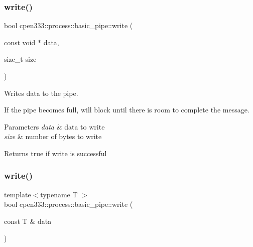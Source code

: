 \subsubsection{\texorpdfstring{write()}{write()}\hspace{0.1cm}{\footnotesize\ttfamily [1/3]}}
{\footnotesize\ttfamily bool cpen333\+::process\+::basic\+\_\+pipe\+::write (\begin{DoxyParamCaption}\item[{const void $\ast$}]{data,  }\item[{size\+\_\+t}]{size }\end{DoxyParamCaption})\hspace{0.3cm}{\ttfamily [inline]}}



Writes data to the pipe. 

If the pipe becomes full, will block until there is room to complete the message.


\begin{DoxyParams}{Parameters}
{\em data} & data to write \\
\hline
{\em size} & number of bytes to write \\
\hline
\end{DoxyParams}
\begin{DoxyReturn}{Returns}
true if write is successful 
\end{DoxyReturn}
\mbox{\label{classcpen333_1_1process_1_1basic__pipe_a41084217cb3913a8db572b012c2a0ea5}} 
\subsubsection{\texorpdfstring{write()}{write()}\hspace{0.1cm}{\footnotesize\ttfamily [2/3]}}
{\footnotesize\ttfamily template$<$typename T $>$ \\
bool cpen333\+::process\+::basic\+\_\+pipe\+::write (\begin{DoxyParamCaption}\item[{const T \&}]{data }\end{DoxyParamCaption})\hspace{0.3cm}{\ttfamily [inline]}}



